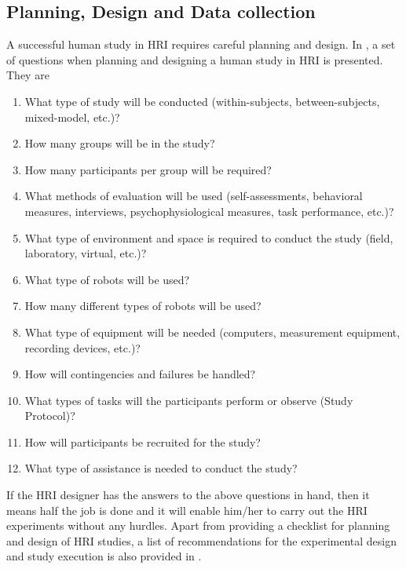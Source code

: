 {\subsection{Planning, Design and Data collection}
A successful human study in HRI requires careful planning and design. In \cite{bethel2010review}, a set of questions  when planning and designing a human study in HRI is presented. They are
\begin{enumerate}
\item What type of study will be conducted (within-subjects, between-subjects, mixed-model, etc.)?
\item How many groups will be in the study?
\item How many participants per group will be required?
\item What methods of evaluation will be used (self-assessments, behavioral measures, interviews, psychophysiological measures, task performance, etc.)?
\item What type of environment and space is required to conduct the study (field, laboratory, virtual, etc.)?
\item What type of robots will be used?
\item How many different types of robots will be used?
\item What type of equipment will be needed (computers, measurement equipment, recording devices, etc.)?
\item How will contingencies and failures be handled?
\item What types of tasks will the participants perform or observe (Study Protocol)?
\item How will participants be recruited for the study?
\item What type of assistance is needed to conduct the study?
\end{enumerate}
	If the HRI designer has the answers to the above questions in hand, then it means half the job is done and it will enable him/her to carry out the HRI experiments without any hurdles. Apart from providing a checklist for planning and design of HRI studies, a list of recommendations for the experimental design and study execution is also provided in \cite{bethel2010review}.
	
}
